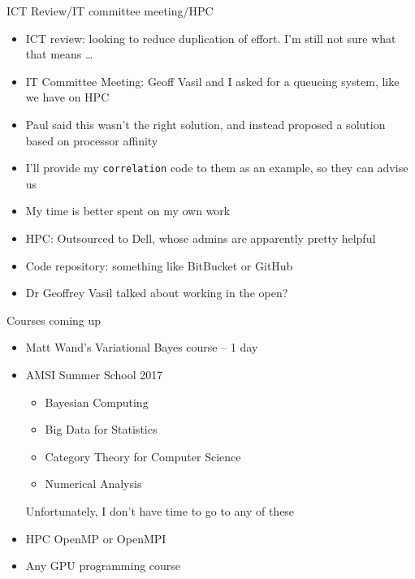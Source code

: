 \documentclass{beamer}
\begin{document}
\begin{frame}{ICT Review/IT committee meeting/HPC}
\begin{itemize}
\item ICT review: looking to reduce duplication of effort. I'm still not sure what that means \ldots
\item IT Committee Meeting: Geoff Vasil and I asked for a queueing system, like we have on HPC
\item Paul said this wasn't the right solution, and instead
proposed a solution based on processor affinity
\item I'll provide my \texttt{correlation} code to them as an example, so they can advise us
\item My time is better spent on my own work
\item HPC: Outsourced to Dell, whose admins are apparently pretty helpful
\item Code repository: something like BitBucket or GitHub
\item Dr Geoffrey Vasil talked about working in the open?
\end{itemize}
\end{frame}

\begin{frame}{Courses coming up}
\begin{itemize}
\item Matt Wand's Variational Bayes course -- 1 day
\item AMSI Summer School 2017
\begin{itemize}
\item Bayesian Computing
\item Big Data for Statistics
\item Category Theory for Computer Science
\item Numerical Analysis
\end{itemize}
Unfortunately, I don't have time to go to any of these
\item HPC OpenMP or OpenMPI
\item Any GPU programming course
\end{itemize}
\end{frame}
\end{document}
